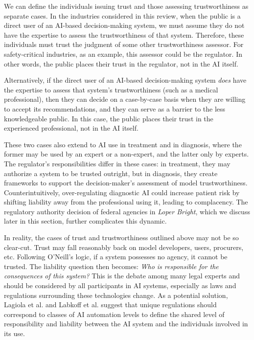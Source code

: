 \documentclass[authoryear,preprint,12pt]{elsarticle}
\begin{document}
We can define the individuals issuing trust and those assessing trustworthiness
as separate cases. In the industries considered in this review, when the public
is a direct user of an AI-based decision-making system, we must assume they do
not have the expertise to assess the trustworthiness of that system. Therefore,
these individuals must trust the judgment of some other trustworthiness
assessor. For safety-critical industries, as an example, this assessor could be
the regulator. In other words, the public places their trust in the regulator,
not in the AI itself. 

Alternatively, if the direct user of an AI-based decision-making system
\textit{does} have the expertise to assess that system's trustworthiness (such
as a medical professional), then they can decide on a case-by-case basis when
they are willing to accept its recommendations, and they can serve as a barrier
to the less knowledgeable public. In this case, the public places their trust in
the experienced professional, not in the AI itself.

These two cases also extend to AI use in treatment and in diagnosis, where the
former may be used by an expert or a non-expert, and the latter only by experts.
The regulator's responsibilities differ in these cases: in treatment, they may
authorize a system to be trusted outright, but in diagnosis, they create
frameworks to support the decision-maker's assessment of model trustworthiness.
Counterintuitively, over-regulating diagnostic AI could increase patient risk by
shifting liability away from the professional using it, leading to complacency.
The regulatory authority decision of federal agencies in \textit{Loper Bright},
which we discuss later in this section, further complicates this dynamic.

In reality, the cases of trust and trustworthiness outlined above may not be so
clear-cut. Trust may fall reasonably back on model developers, users, procurers,
etc. Following O'Neill's logic, if a system possesses no agency, it cannot be
trusted. The liability question then becomes: \textit{Who is responsible for the
consequences of this system?} This is the debate among many legal experts and
should be considered by all participants in AI systems, especially as laws and
regulations surrounding these technologies change. As a potential solution,
Lagiola et al. \cite{lagioiaStrangeCaseDr2020} and Labkoff et al.
\cite{labkoffResponsibleFutureRecommendations2024} suggest that unique
regulations should correspond to classes of AI automation levels to define the
shared level of responsibility and liability between the AI system and the
individuals involved in its use. 
\end{document}
